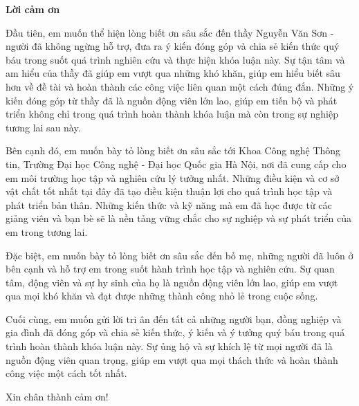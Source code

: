 \begin{center}
\textbf{\large{Lời cảm ơn}	}
\end{center}

Đầu tiên, em muốn thể hiện lòng biết ơn sâu sắc đến thầy Nguyễn Văn Sơn - người đã không ngừng hỗ trợ, đưa ra ý kiến đóng góp và chia sẻ kiến thức quý báu trong suốt quá trình nghiên cứu và thực hiện khóa luận này. Sự tận tâm và am hiểu của thầy đã giúp em vượt qua những khó khăn, giúp em hiểu biết sâu hơn về đề tài và hoàn thành các công việc liên quan một cách đúng đắn. Những ý kiến đóng góp từ thầy đã là nguồn động viên lớn lao, giúp em tiến bộ và phát triển không chỉ trong quá trình hoàn thành khóa luận mà còn trong sự nghiệp tương lai sau này.

Bên cạnh đó, em muốn bày tỏ lòng biết ơn sâu sắc tới Khoa Công nghệ Thông tin, Trường Đại học Công nghệ - Đại học Quốc gia Hà Nội, nơi đã cung cấp cho em môi trường học tập và nghiên cứu lý tưởng nhất. Những điều kiện và cơ sở vật chất tốt nhất tại đây đã tạo điều kiện thuận lợi cho quá trình học tập và phát triển bản thân. Những kiến thức và kỹ năng mà em đã học được từ các giảng viên và bạn bè sẽ là nền tảng vững chắc cho sự nghiệp và sự phát triển của em trong tương lai.

Đặc biệt, em muốn bày tỏ lòng biết ơn sâu sắc đến bố mẹ, những người đã luôn ở bên cạnh và hỗ trợ em trong suốt hành trình học tập và nghiên cứu. Sự quan tâm, động viên và sự hy sinh của họ là nguồn động viên lớn lao, giúp em vượt qua mọi khó khăn và đạt được những thành công nhỏ lẻ trong cuộc sống. 

Cuối cùng, em muốn gửi lời tri ân đến tất cả những người bạn, đồng nghiệp và gia đình đã đóng góp và chia sẻ kiến thức, ý kiến và ý tưởng quý báu trong quá trình hoàn thành khóa luận này. Sự ủng hộ và sự khích lệ từ mọi người đã là nguồn động viên quan trọng, giúp em vượt qua mọi thách thức và hoàn thành công việc một cách tốt nhất.

Xin chân thành cảm ơn!

